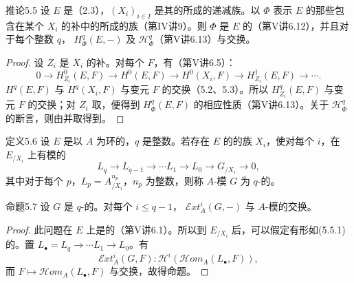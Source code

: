 \begin{SGAresult}{推论}{5.5}
设 $E$ 是（2.3），$(X_i)_{i\in I}$ 是其的所成的递减族。以 $\Phi$ 表示 $E$ 的那些包含在某个 $X_i$ 的补中的所成的族（第IV讲9）。则 $\Phi$ 是 $E$ 的（第V讲6.12），并且对于每个整数 $q$， $H^q_\Phi(E,-)$ 及 $\mathscr H^q_\Phi$（第V讲6.13）与交换。
\end{SGAresult}
\begin{proof}
设 $Z_i$ 是 $X_i$ 的补。对每个 $F$，有（第V讲6.5）：
\[
0\longrightarrow H^0_{Z_i}(E,F)\longrightarrow H^0(E,F)
\longrightarrow H^0(X_i,F)\longrightarrow H^1_{Z_i}(E,F)\longrightarrow\cdots.
\]
 $H^q(E,F)$ 与 $H^q(X_i,F)$ 与变元 $F$ 的交换（5.2、5.3）。所以 $H^q_{Z_i}(E,F)$ 与变元 $F$ 的交换；对 $Z_i$ 取，便得到 $H^q_\Phi(E,F)$ 的相应性质（第V讲6.13）。关于 $\mathscr H^q_\Phi$ 的断言，则由并取得到。
\end{proof}

\begin{SGAresult}{定义}{5.6}
设 $E$ 是以 $A$ 为环的，$q$ 是整数。若存在 $E$ 的的族 $X_i$，使对每个 $i$，在 $E_{/X_i}$ 上有模的
\[
L_q\longrightarrow L_{q-1}\longrightarrow\cdots L_1\longrightarrow L_0\longrightarrow G_{/X_i}\longrightarrow0,\tag{5.5.1}
\]
其中对于每个 $p$，$L_p=A_{/X_i}^{n_p}$，$n_p$ 为整数，则称 $A$-模 $G$ 为 $q$-的。
\end{SGAresult}

\begin{SGAresult}{命题}{5.7}
设 $G$ 是 $q$-的。对每个 $i\leq q-1$， $\mathscr{E}\!xt_A^i(G,-)$ 与 $A$-模的交换。
\end{SGAresult}
\begin{proof}
此问题在 $E$ 上是的（第V讲6.1）。所以到 $E_{/X_i}$ 后，可以假定有形如(5.5.1)的。置 $L_{\bullet}=L_q\to\cdots L_1\to L_0$。有
\[
\mathscr{E}\!xt_A^i(G,F):\mathscr H^i(\mathscr{H}\!om_A(L_{\bullet},F)),
\]
而 $F\mapsto\mathscr{H}\!om_A(L_{\bullet},F)$ 与交换，故得命题。
\end{proof}

